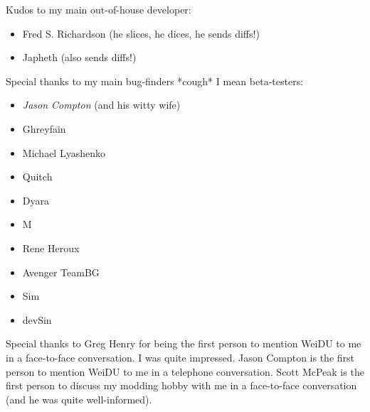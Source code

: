\documentclass{article}
\begin{document}
Kudos to my main out-of-house developer:
\begin{itemize}
\item Fred S. Richardson (he slices, he dices, he sends diffs!)
\item Japheth (also sends diffs!)
\end{itemize}

Special thanks to my main bug-finders *cough* I mean beta-testers:
\begin{itemize}
\item {\em Jason Compton } (and his witty wife)
\item Ghreyfain
\item Michael Lyashenko
\item Quitch
\item Dyara
\item M
\item Rene Heroux
\item Avenger TeamBG
\item Sim
\item devSin

\end{itemize}

Special thanks to Greg Henry for being the first person to mention WeiDU to
me in a face-to-face conversation. I was quite impressed. Jason Compton is
the first person to mention WeiDU to me in a telephone conversation. Scott
McPeak is the first person to discuss my modding hobby with me in a
face-to-face conversation (and he was quite well-informed).
\end{document}
